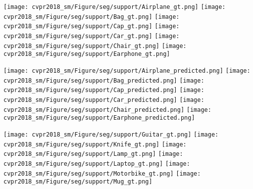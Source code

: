 \documentclass[10pt,twocolumn,letterpaper]{article}
\begin{document}
\begin{figure*}[t] 
        \centering
        \texttt{[image: cvpr2018\_sm/Figure/seg/support/Airplane\_gt.png]} \hspace{10pt}
        \texttt{[image: cvpr2018\_sm/Figure/seg/support/Bag\_gt.png]} \hspace{10pt}
        \texttt{[image: cvpr2018\_sm/Figure/seg/support/Cap\_gt.png]} \hspace{10pt}
        \texttt{[image: cvpr2018\_sm/Figure/seg/support/Car\_gt.png]} \hspace{10pt}
        \texttt{[image: cvpr2018\_sm/Figure/seg/support/Chair\_gt.png]} \hspace{10pt}
        \texttt{[image: cvpr2018\_sm/Figure/seg/support/Earphone\_gt.png]}
        
        \texttt{[image: cvpr2018\_sm/Figure/seg/support/Airplane\_predicted.png]} \hspace{10pt}
        \texttt{[image: cvpr2018\_sm/Figure/seg/support/Bag\_predicted.png]} \hspace{10pt}
        \texttt{[image: cvpr2018\_sm/Figure/seg/support/Cap\_predicted.png]} \hspace{10pt}
        \texttt{[image: cvpr2018\_sm/Figure/seg/support/Car\_predicted.png]} \hspace{10pt}
        \texttt{[image: cvpr2018\_sm/Figure/seg/support/Chair\_predicted.png]} \hspace{10pt}
        \texttt{[image: cvpr2018\_sm/Figure/seg/support/Earphone\_predicted.png]}
        
        \vspace{15pt}
        
        \texttt{[image: cvpr2018\_sm/Figure/seg/support/Guitar\_gt.png]} \hspace{10pt}
        \texttt{[image: cvpr2018\_sm/Figure/seg/support/Knife\_gt.png]} \hspace{10pt}
        \texttt{[image: cvpr2018\_sm/Figure/seg/support/Lamp\_gt.png]} \hspace{10pt}
        \texttt{[image: cvpr2018\_sm/Figure/seg/support/Laptop\_gt.png]} \hspace{10pt}
        \texttt{[image: cvpr2018\_sm/Figure/seg/support/Motorbike\_gt.png]} \hspace{10pt}
        \texttt{[image: cvpr2018\_sm/Figure/seg/support/Mug\_gt.png]}
        

\end{figure*}
\end{document}
